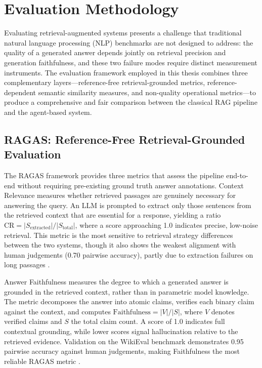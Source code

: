 \section{Evaluation Methodology}

Evaluating retrieval-augmented systems presents a challenge that traditional natural language processing (NLP) benchmarks are not designed to address: the quality of a generated answer depends jointly on retrieval precision and generation faithfulness, and these two failure modes require distinct measurement instruments. The evaluation framework employed in this thesis combines three complementary layers—reference-free retrieval-grounded metrics, reference-dependent semantic similarity measures, and non-quality operational metrics—to produce a comprehensive and fair comparison between the classical RAG pipeline and the agent-based system.

\subsection*{RAGAS: Reference-Free Retrieval-Grounded Evaluation}

The RAGAS framework \cite{es2023ragas} provides three metrics that assess the pipeline end-to-end without requiring pre-existing ground truth answer annotations. Context Relevance measures whether retrieved passages are genuinely necessary for answering the query. An LLM is prompted to extract only those sentences from the retrieved context that are essential for a response, yielding a ratio $\text{CR} = |S_{\text{extracted}}| / |S_{\text{total}}|$, where a score approaching 1.0 indicates precise, low-noise retrieval. This metric is the most sensitive to retrieval strategy differences between the two systems, though it also shows the weakest alignment with human judgements (0.70 pairwise accuracy), partly due to extraction failures on long passages \cite{es2023ragas}.

Answer Faithfulness measures the degree to which a generated answer is grounded in the retrieved context, rather than in parametric model knowledge. The metric decomposes the answer into atomic claims, verifies each binary claim against the context, and computes $\text{Faithfulness} = |V| / |S|$, where $V$ denotes verified claims and $S$ the total claim count. A score of 1.0 indicates full contextual grounding, while lower scores signal hallucination relative to the retrieved evidence. Validation on the WikiEval benchmark demonstrates 0.95 pairwise accuracy against human judgements, making Faithfulness the most reliable RAGAS metric \cite{es2023ragas}.

